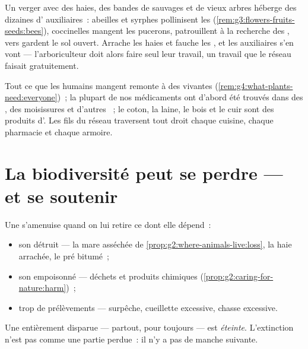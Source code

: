 \begin{example}\label{ex:g5:biodiversity:orchard}
Un verger avec des haies, des bandes de  sauvages et de vieux
arbres héberge des dizaines d' auxiliaires~: abeilles et
syrphes pollinisent les 
(\cref{rem:g3:flowers-fruits-seeds:bees}), coccinelles mangent les
pucerons,  patrouillent à la recherche des , vers
gardent le sol ouvert. Arrache les haies et fauche les , et
les auxiliaires s'en vont --- l'arboriculteur doit alors faire seul
leur travail, un travail que le réseau faisait gratuitement.
\end{example}

\begin{example}\label{ex:g5:biodiversity:people}
Tout ce que les humains mangent remonte à des  vivantes
(\cref{rem:g4:what-plants-need:everyone})~; la plupart de nos
médicaments ont d'abord été trouvés dans des , des
moisissures et d'autres ~; le coton, la laine, le bois
et le cuir sont des produits d'. Les fils du réseau traversent
tout droit chaque cuisine, chaque pharmacie et chaque armoire.
\end{example}

\section{La biodiversité peut se perdre --- et se soutenir}

\begin{proposition}\label{prop:g5:biodiversity:loss}
Une  s'amenuise quand on lui retire ce dont elle dépend~:
\begin{itemize}
  \item son \emph{} détruit --- la mare asséchée de
        \cref{prop:g2:where-animals-live:loss}, la haie arrachée,
        le pré bitumé~;
  \item son  empoisonné --- déchets et produits
        chimiques (\cref{prop:g2:caring-for-nature:harm})~;
  \item trop de prélèvements --- surpêche, cueillette excessive,
        chasse excessive.
\end{itemize}
Une  entièrement disparue --- partout, pour toujours --- est
\emph{éteinte}. L'extinction n'est pas comme une
partie perdue~: il n'y a pas de manche suivante.
\end{proposition}
\admitted

